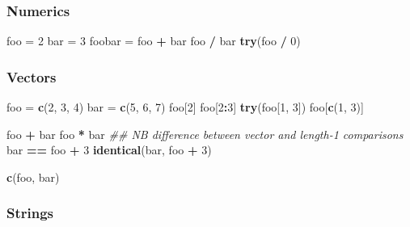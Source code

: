 \documentclass[
]{article}
\newenvironment{Shaded}{\begin{snugshade}}{\end{snugshade}}
\newcommand{\CommentTok}[1]{\textcolor[rgb]{0.56,0.35,0.01}{\textit{#1}}}
\newcommand{\DecValTok}[1]{\textcolor[rgb]{0.00,0.00,0.81}{#1}}
\newcommand{\KeywordTok}[1]{\textcolor[rgb]{0.13,0.29,0.53}{\textbf{#1}}}
\newcommand{\NormalTok}[1]{#1}
\newcommand{\OperatorTok}[1]{\textcolor[rgb]{0.81,0.36,0.00}{\textbf{#1}}}
\newcommand{\StringTok}[1]{\textcolor[rgb]{0.31,0.60,0.02}{#1}}
\begin{document}
\hypertarget{numerics}{%
\subsubsection{Numerics}\label{numerics}}

\begin{Shaded}
\begin{Highlighting}[]
\NormalTok{foo =}\StringTok{ }\DecValTok{2}
\NormalTok{bar =}\StringTok{ }\DecValTok{3}
\NormalTok{foobar =}\StringTok{ }\NormalTok{foo }\OperatorTok{+}\StringTok{ }\NormalTok{bar}
\NormalTok{foo }\OperatorTok{/}\StringTok{ }\NormalTok{bar}
\KeywordTok{try}\NormalTok{(foo }\OperatorTok{/}\StringTok{ }\DecValTok{0}\NormalTok{)}
\end{Highlighting}
\end{Shaded}

\hypertarget{vectors}{%
\subsubsection{Vectors}\label{vectors}}

\begin{Shaded}
\begin{Highlighting}[]
\NormalTok{foo =}\StringTok{ }\KeywordTok{c}\NormalTok{(}\DecValTok{2}\NormalTok{, }\DecValTok{3}\NormalTok{, }\DecValTok{4}\NormalTok{)}
\NormalTok{bar =}\StringTok{ }\KeywordTok{c}\NormalTok{(}\DecValTok{5}\NormalTok{, }\DecValTok{6}\NormalTok{, }\DecValTok{7}\NormalTok{)}
\NormalTok{foo[}\DecValTok{2}\NormalTok{]}
\NormalTok{foo[}\DecValTok{2}\OperatorTok{:}\DecValTok{3}\NormalTok{]}
\KeywordTok{try}\NormalTok{(foo[}\DecValTok{1}\NormalTok{, }\DecValTok{3}\NormalTok{])}
\NormalTok{foo[}\KeywordTok{c}\NormalTok{(}\DecValTok{1}\NormalTok{, }\DecValTok{3}\NormalTok{)]}

\NormalTok{foo }\OperatorTok{+}\StringTok{ }\NormalTok{bar}
\NormalTok{foo }\OperatorTok{*}\StringTok{ }\NormalTok{bar}
\CommentTok{\#\# NB difference between vector and length{-}1 comparisons}
\NormalTok{bar }\OperatorTok{==}\StringTok{ }\NormalTok{foo }\OperatorTok{+}\StringTok{ }\DecValTok{3}
\KeywordTok{identical}\NormalTok{(bar, foo }\OperatorTok{+}\StringTok{ }\DecValTok{3}\NormalTok{)}

\KeywordTok{c}\NormalTok{(foo, bar)}
\end{Highlighting}
\end{Shaded}

\hypertarget{strings}{%
\subsubsection{Strings}\label{strings}}
\end{document}
